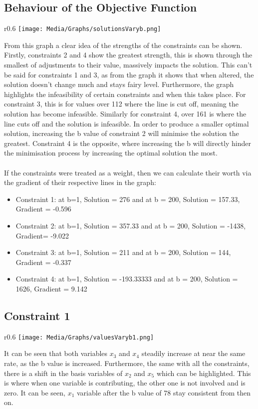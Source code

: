 \documentclass{article}
\numberwithin{equation}{section}
\begin{document}
\subsection{Behaviour of the Objective Function}
\begin{wrapfigure}{r}{0.6\textwidth}
    \centering
    \texttt{[image: Media/Graphs/solutionsVaryb.png]}
\end{wrapfigure}
From this graph a clear idea of the strengths of the constraints can be shown. Firstly, constraints 2 and 4 show the greatest strength, this is shown through the smallest of adjustments to their value, massively impacts the solution. This can't be said for constraints 1 and 3, as from the graph it shows that when altered, the solution doesn't change much and stays fairy level. Furthermore, the graph highlights the infeasibility of certain constraints and when this takes place. For constraint 3, this is for values over 112 where the line is cut off, meaning the solution has become infeasible. Similarly for constraint 4, over 161 is where the line cuts off and the solution is infeasible. In order to produce a smaller optimal solution, increasing the b value of constraint 2 will minimise the solution the greatest. Constraint 4 is the opposite, where increasing the b will directly hinder the minimisation process by increasing the optimal solution the most. \\ \\
If the constraints were treated as a weight, then we can calculate their worth via the gradient of their respective lines in the graph:
\begin{itemize}
    \item Constraint 1: at b=1, Solution = 276 and at b = 200, Solution = 157.33,    Gradient = -0.596
    \item Constraint 2: at b=1, Solution = 357.33 and at b = 200, Solution = -1438, Gradient= -9.022
    \item Constraint 3: at b=1, Solution = 211 and at b = 200, Solution = 144, Gradient = -0.337
    \item Constraint 4: at b=1, Solution = -193.33333 and at b = 200, Solution = 1626, Gradient = 9.142
\end{itemize}
\subsection{Constraint 1}
\begin{wrapfigure}{r}{0.6\textwidth}
    \centering
    \texttt{[image: Media/Graphs/valuesVaryb1.png]}
\end{wrapfigure}
It can be seen that both variables $x_3$ and $x_4$ steadily increase at near the same rate, as the b value is increased. Furthermore, the same with all the constraints, there is a shift in the basis variables of $x_2$ and $x_5$ which can be highlighted. This is where when one variable is contributing, the other one is not involved and is zero. It can be seen, $x_1$ variable after the b value of 78 stay consistent from then on. 
\newpage
\end{document}
